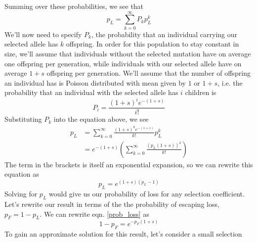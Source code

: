 Summing over these probabilities, we see that
\begin{equation}
  p_L = \sum_{k=0}^{\infty} P_k p_L^{k}
\end{equation}
We'll now need to specify $P_k$, the probability that an individual
carrying our selected allele has $k$ offspring. In order for this population to stay constant in size,
we'll assume that individuals without the selected mutation have on average one
offspring per generation, while individuals with our selected allele
have on average $1+s$ offspring per generation. We'll assume that the
number of offspring an individual has is Poisson
distributed with mean given by $1$ or $1+s$, i.e. the probability that an individual
with the selected allele has $i$ children is
\begin{equation}
P_i= \frac{(1+s)^i e^{-(1+s)}}{i!}
\end{equation}
Substituting $P_k$ into the equation above, we see
  \begin{align}
p_L &=  \sum_{k=0}^{\infty} \frac{(1+s)^ke^{-(1+s)}}{k!} p_L^{k} \nonumber
\\
&= e^{-(1+s)} \left( \sum_{k=0}^{\infty} \frac{\left(p_L(1+s) \right)^k}{k!}  \right)
\end{align}
The term in the brackets is itself an exponential expansion, so
we can rewrite this equation as
\begin{equation}
p_L = e^{(1+s)(p_L-1)} \label{prob_loss}
\end{equation}
Solving for $p_L$ would give us our probability of loss for any selection
coefficient. Let's
rewrite our result in terms of the the probability of escaping loss, $p_F = 1-p_L$.  We can
rewrite eqn. \eqref{prob_loss} as
\begin{equation}
1-p_F = e^{-p_F(1+s)}
\end{equation}
To gain an approximate solution for this result, let's consider a small selection
